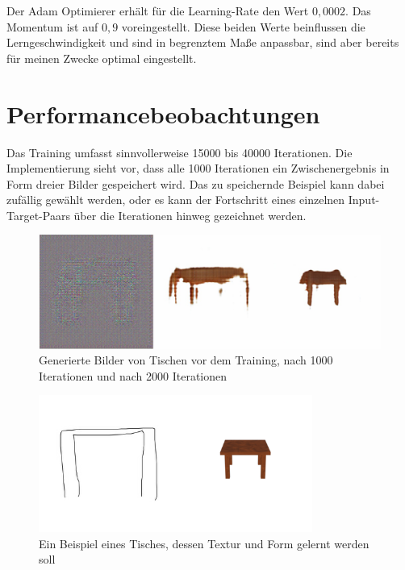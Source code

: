 Der Adam Optimierer \cite{kingma2017adam} erhält für die Learning-Rate den Wert $0,0002$. Das Momentum ist auf $0,9$ voreingestellt. Diese beiden Werte beinflussen die Lerngeschwindigkeit und sind in begrenztem Maße anpassbar, sind aber bereits für meinen Zwecke optimal eingestellt.

\section{Performancebeobachtungen}
\label{sec:performance}
Das Training umfasst sinnvollerweise 15000 bis 40000 Iterationen. Die Implementierung sieht vor, dass alle 1000 Iterationen ein Zwischenergebnis in Form dreier Bilder gespeichert wird. Das zu speichernde Beispiel kann dabei zufällig gewählt werden, oder es kann der Fortschritt eines einzelnen Input-Target-Paars über die Iterationen hinweg gezeichnet werden.

\begin{figure}[h]
	\centering
	\includegraphics[width=1.0\textwidth]{bilder/pix2pix_progress/progress_tables.png}
	\caption[Lernfortschritt am Beispiel von Tischen 1]{Generierte Bilder von Tischen vor dem Training, nach 1000 Iterationen und nach 2000 Iterationen}
	\label{fig:pix2pixprogress1}
\end{figure}

\begin{figure}[h]
  \centering
	\includegraphics[width=0.8\textwidth]{bilder/pix2pix_progress/394_input.png}
  \caption[Quadratischer Tisch]{Ein Beispiel eines Tisches, dessen Textur und Form gelernt werden soll}
  \label{fig:trainingexample}
\end{figure}

